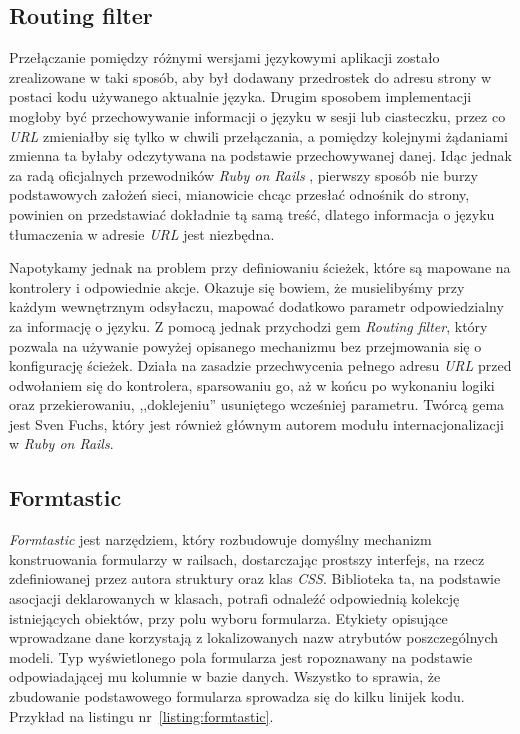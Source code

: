 \documentclass[12pt,twoside]{report}
\begin{document}
\subsection{Routing filter}
Przełączanie pomiędzy różnymi wersjami językowymi aplikacji zostało zrealizowane w taki
sposób, aby był dodawany przedrostek do adresu strony w postaci kodu używanego aktualnie
języka. Drugim sposobem implementacji mogłoby być przechowywanie informacji o języku w sesji
lub ciasteczku, przez co \emph{URL} zmieniałby się tylko w chwili przełączania, a pomiędzy
kolejnymi żądaniami zmienna ta byłaby odczytywana na podstawie przechowywanej danej.
Idąc jednak za radą oficjalnych przewodników \emph{Ruby on Rails} \cite{rails-guides},
pierwszy sposób nie burzy podstawowych założeń sieci, mianowicie chcąc przesłać odnośnik
do strony, powinien on przedstawiać dokładnie tą samą treść, dlatego informacja o języku
tłumaczenia w adresie \emph{URL} jest niezbędna.


Napotykamy jednak na problem przy definiowaniu ścieżek, które są mapowane na kontrolery i
odpowiednie akcje. Okazuje się bowiem, że musielibyśmy przy każdym wewnętrznym odsyłaczu,
mapować dodatkowo parametr odpowiedzialny za informację o języku. Z pomocą jednak
przychodzi gem \emph{Routing filter}, który pozwala na używanie powyżej opisanego
mechanizmu bez przejmowania się o konfigurację ścieżek. Działa na zasadzie przechwycenia
pełnego adresu \emph{URL} przed odwołaniem się do kontrolera, sparsowaniu go, aż w końcu
po wykonaniu logiki oraz przekierowaniu, ,,doklejeniu'' usuniętego wcześniej parametru.
Twórcą gema jest Sven Fuchs, który jest również głównym autorem modułu internacjonalizacji
w \emph{Ruby on Rails}.

\subsection{Formtastic}
\emph{Formtastic} jest narzędziem, który rozbudowuje domyślny mechanizm konstruowania
formularzy w railsach, dostarczając prostszy interfejs, na rzecz zdefiniowanej przez
autora struktury oraz klas \emph{CSS}. Biblioteka ta, na podstawie asocjacji deklarowanych
w klasach, potrafi odnaleźć odpowiednią kolekcję istniejących obiektów, przy polu wyboru
formularza. Etykiety opisujące wprowadzane dane korzystają z lokalizowanych nazw atrybutów
poszczególnych modeli. Typ wyświetlonego pola formularza jest ropoznawany na podstawie
odpowiadającej mu kolumnie w bazie danych. Wszystko to sprawia, że zbudowanie podstawowego
formularza sprowadza się do kilku linijek kodu. Przykład na listingu
nr~\ref{listing:formtastic}.
\end{document}
